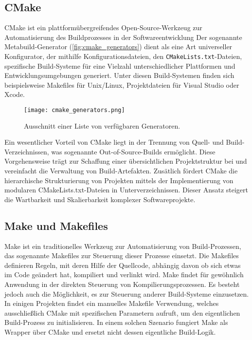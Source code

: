 \subsection{CMake}
CMake ist ein plattformübergreifendes Open-Source-Werkzeug zur Automatisierung des Buildprozesses in der Softwareentwicklung
Der sogenannte Metabuild-Generator (\autoref{fig:cmake_generators}) dient als eine Art universeller Konfigurator, der mithilfe Konfigurationsdateien, den \texttt{CMakeLists.txt}-Dateien, spezifische Build-Systeme für eine Vielzahl unterschiedlicher Plattformen und Entwicklungsumgebungen generiert.
Unter diesen Build-Systemen finden sich beispielsweise Makefiles für Unix/Linux, Projektdateien für Visual Studio oder Xcode.

\begin{figure}[H]
	\texttt{[image: cmake\_generators.png]}
	\caption{Ausschnitt einer Liste von verfügbaren Generatoren.}
	\label{fig:cmake_generators}
\end{figure}

Ein wesentlicher Vorteil von CMake liegt in der Trennung von Quell- und Build-Verzeichnissen, was sogenannte Out-of-Source-Builds ermöglicht.
Diese Vorgehensweise trägt zur Schaffung einer übersichtlichen Projektstruktur bei und vereinfacht die Verwaltung von Build-Artefakten.
Zusätlich fördert CMake die hierarchische Strukturierung von Projekten mittels der Implementierung von modularen CMakeLists.txt-Dateien in Unterverzeichnissen.
Dieser Ansatz steigert die Wartbarkeit und Skalierbarkeit komplexer Softwareprojekte.

\subsection{Make und Makefiles}
Make ist ein traditionelles Werkzeug zur Automatisierung von Build-Prozessen, das sogenannte Makefiles zur Steuerung dieser Prozesse einsetzt.
Die Makefiles definieren Regeln, mit deren Hilfe der Quellcode, abhängig davon ob sich etwas im Code geändert hat, kompiliert und verlinkt wird.
Make findet für gewöhnlich Anwendung in der direkten Steuerung von Kompilierungsprozessen.
 Es besteht jedoch auch die Möglichkeit, es zur Steuerung anderer Build-Systeme einzusetzen.
In einigen Projekten findet ein manuelles Makefile Verwendung, welches ausschließlich CMake mit spezifischen Parametern aufruft, um den eigentlichen Build-Prozess zu initialisieren.
In einem solchen Szenario fungiert Make als Wrapper über CMake und ersetzt nicht dessen eigentliche Build-Logik.


